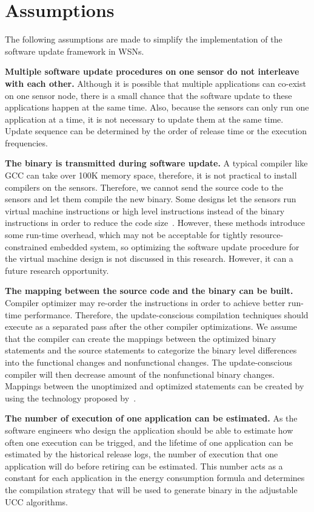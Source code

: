 \section{Assumptions}
The following assumptions are made to simplify the implementation of the software update framework in WSNs.

\textbf{Multiple software update procedures on one sensor do not interleave with each other.}
Although it is possible that multiple applications can co-exist on one sensor node, there is a small chance that the software update to these applications happen at the same time.
Also, because the sensors can only run one application at a time, it is not necessary to update them at the same time.
Update sequence can be determined by the order of release time or the execution frequencies.

\textbf{The binary is transmitted during software update.}
A typical compiler like GCC can take over 100K memory space, therefore, it is not practical to install compilers on the sensors.
Therefore, we cannot send the source code to the sensors and let them compile the new binary.
Some designs let the sensors run virtual machine instructions or high level instructions instead of the binary instructions in order to reduce the code size~\cite{mate,related:dynamic1, related:dynamic2}. However, these methods introduce some run-time overhead, which may not be acceptable for tightly resource-constrained embedded system, so optimizing the software update procedure for the virtual machine design is not discussed in this research. However, it can a future research opportunity.

\textbf{The mapping between the source code and the binary can be built.} Compiler optimizer may re-order the instructions in order to achieve better run-time performance. Therefore, the update-conscious compilation techniques should execute as a separated pass after the other compiler optimizations. 
We assume that the compiler can create the mappings between the optimized binary statements and the source statements to categorize the binary level differences into the functional changes and nonfunctional changes.
The update-conscious compiler will then decrease amount of the nonfunctional binary changes.
Mappings between the unoptimized and optimized statements can be created by using the technology proposed by~\cite{mapping}.


\textbf{The number of execution of one application can be estimated.}
As the software engineers who design the application should be able to estimate how often one execution can be trigged, and the lifetime of one application can be estimated by the historical release logs, the number of execution that one application will do before retiring can be estimated. This number acts as a constant for each application in the energy consumption formula and determines the compilation strategy that will be used to generate binary in the adjustable UCC algorithms.

